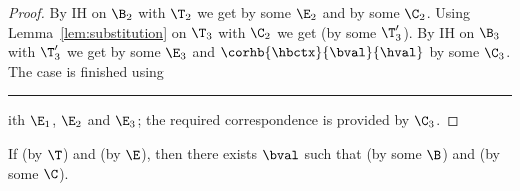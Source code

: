 \begin{proof}
By IH on $\B_2$ with $\T_2$ we get  by some $\E_2$ and  by some $\C_2$.
Using Lemma~\ref{lem:substitution} on $\T_3$ with $\C_2$ we get  (by some $\T_3'$).
By IH on $\B_3$ with $\T_3'$ we get  by some $\E_3$ and $\corhb{\hbctx}{\bval}{\hval}$ by some $\C_3$.
The case is finished using \rule{E-App} with $\E_1$, $\E_2$ and $\E_3$; the required correspondence is provided by $\C_3$.

\end{proof}

\begin{lemma}[Completeness]
\label{lem:completeness-hb}
If \trahb{\hbctx}{\benv}{\hexp}{\bexp} (by $\T$) and \hev{\hexp}{\hval} (by $\E$), then there exists $\bval$ such that \bev{\benv}{\bexp}{\bval} (by some $\B$) and \corhb{\hbctx}{\bval}{\hval} (by some $\C$).
\end{lemma}








